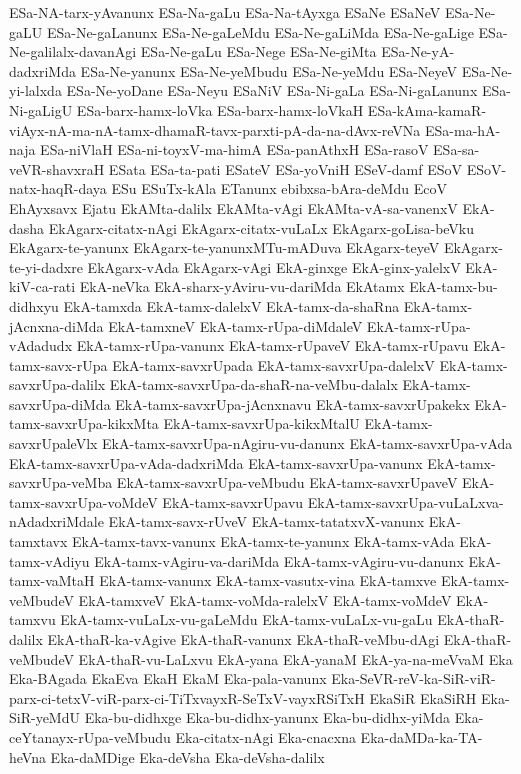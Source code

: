 {ESa-NA-tarx-yAvanunx
ESa-Na-gaLu
ESa-Na-tAyxga
ESaNe
ESaNeV
ESa-Ne-gaLU
ESa-Ne-gaLanunx
ESa-Ne-gaLeMdu
ESa-Ne-gaLiMda
ESa-Ne-gaLige
ESa-Ne-galilalx-davanAgi
ESa-Ne-gaLu
ESa-Nege
ESa-Ne-giMta
ESa-Ne-yA-dadxriMda
ESa-Ne-yanunx
ESa-Ne-yeMbudu
ESa-Ne-yeMdu
ESa-NeyeV
ESa-Ne-yi-lalxda
ESa-Ne-yoDane
ESa-Neyu
ESaNiV
ESa-Ni-gaLa
ESa-Ni-gaLanunx
ESa-Ni-gaLigU
ESa-barx-hamx-loVka
ESa-barx-hamx-loVkaH
ESa-kAma-kamaR-viAyx-nA-ma-nA-tamx-dhamaR-tavx-parxti-pA-da-na-dAvx-reVNa
ESa-ma-hA-naja
ESa-niVlaH
ESa-ni-toyxV-ma-himA
ESa-panAthxH
ESa-rasoV
ESa-sa-veVR-shavxraH
ESata
ESa-ta-pati
ESateV
ESa-yoVniH
ESeV-damf
ESoV
ESoV-natx-haqR-daya
ESu
ESuTx-kAla
ETanunx
ebibxsa-bAra-deMdu
EcoV
EhAyxsavx
Ejatu
EkAMta-dalilx
EkAMta-vAgi
EkAMta-vA-sa-vanenxV
EkA-dasha
EkAgarx-citatx-nAgi
EkAgarx-citatx-vuLaLx
EkAgarx-goLisa-beVku
EkAgarx-te-yanunx
EkAgarx-te-yanunxMTu-mADuva
EkAgarx-teyeV
EkAgarx-te-yi-dadxre
EkAgarx-vAda
EkAgarx-vAgi
EkA-ginxge
EkA-ginx-yalelxV
EkA-kiV-ca-rati
EkA-neVka
EkA-sharx-yAviru-vu-dariMda
EkAtamx
EkA-tamx-bu-didhxyu
EkA-tamxda
EkA-tamx-dalelxV
EkA-tamx-da-shaRna
EkA-tamx-jAcnxna-diMda
EkA-tamxneV
EkA-tamx-rUpa-diMdaleV
EkA-tamx-rUpa-vAdadudx
EkA-tamx-rUpa-vanunx
EkA-tamx-rUpaveV
EkA-tamx-rUpavu
EkA-tamx-savx-rUpa
EkA-tamx-savxrUpada
EkA-tamx-savxrUpa-dalelxV
EkA-tamx-savxrUpa-dalilx
EkA-tamx-savxrUpa-da-shaR-na-veMbu-dalalx
EkA-tamx-savxrUpa-diMda
EkA-tamx-savxrUpa-jAcnxnavu
EkA-tamx-savxrUpakekx
EkA-tamx-savxrUpa-kikxMta
EkA-tamx-savxrUpa-kikxMtalU
EkA-tamx-savxrUpaleVlx
EkA-tamx-savxrUpa-nAgiru-vu-danunx
EkA-tamx-savxrUpa-vAda
EkA-tamx-savxrUpa-vAda-dadxriMda
EkA-tamx-savxrUpa-vanunx
EkA-tamx-savxrUpa-veMba
EkA-tamx-savxrUpa-veMbudu
EkA-tamx-savxrUpaveV
EkA-tamx-savxrUpa-voMdeV
EkA-tamx-savxrUpavu
EkA-tamx-savxrUpa-vuLaLxva-nAdadxriMdale
EkA-tamx-savx-rUveV
EkA-tamx-tatatxvX-vanunx
EkA-tamxtavx
EkA-tamx-tavx-vanunx
EkA-tamx-te-yanunx
EkA-tamx-vAda
EkA-tamx-vAdiyu
EkA-tamx-vAgiru-va-dariMda
EkA-tamx-vAgiru-vu-danunx
EkA-tamx-vaMtaH
EkA-tamx-vanunx
EkA-tamx-vasutx-vina
EkA-tamxve
EkA-tamx-veMbudeV
EkA-tamxveV
EkA-tamx-voMda-ralelxV
EkA-tamx-voMdeV
EkA-tamxvu
EkA-tamx-vuLaLx-vu-gaLeMdu
EkA-tamx-vuLaLx-vu-gaLu
EkA-thaR-dalilx
EkA-thaR-ka-vAgive
EkA-thaR-vanunx
EkA-thaR-veMbu-dAgi
EkA-thaR-veMbudeV
EkA-thaR-vu-LaLxvu
EkA-yana
EkA-yanaM
EkA-ya-na-meVvaM
Eka
Eka-BAgada
EkaEva
EkaH
EkaM
Eka-pala-vanunx
Eka-SeVR-reV-ka-SiR-viR-parx-ci-tetxV-viR-parx-ci-TiTxvayxR-SeTxV-vayxRSiTxH
EkaSiR
EkaSiRH
Eka-SiR-yeMdU
Eka-bu-didhxge
Eka-bu-didhx-yanunx
Eka-bu-didhx-yiMda
Eka-ceYtanayx-rUpa-veMbudu
Eka-citatx-nAgi
Eka-cnacxna
Eka-daMDa-ka-TA-heVna
Eka-daMDige
Eka-deVsha
Eka-deVsha-dalilx
}
